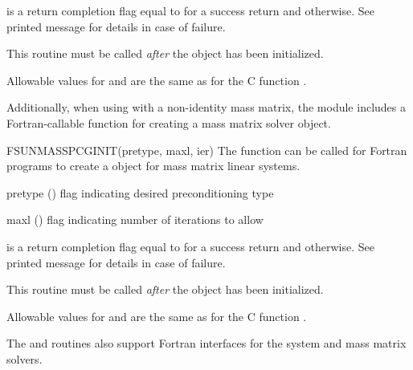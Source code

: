 {
   is a return completion flag equal to  for a success
  return and  otherwise. See printed message for details in case
  of failure.
}
{
  This routine must be called \emph{after} the {\nvector} object has
  been initialized.

  Allowable values for  and  are the same as for
  the C function .
}
Additionally, when using
{\arkode} with a non-identity mass matrix, the {\sunlinsolpcg} module
includes a Fortran-callable function for creating a
 mass matrix solver object.

{
  FSUNMASSPCGINIT(pretype, maxl, ier)
}
{
  The function  can be called for Fortran programs
  to create a {\sunlinsolpcg} object for mass matrix linear systems.
}
{
  \begin{args}[pretype]
  \item[pretype] ()
    flag indicating desired preconditioning type
  \item[maxl] ()
    flag indicating number of iterations to allow
  \end{args}
}
{
   is a  return completion flag equal to  for a success
  return and  otherwise. See printed message for details in case
  of failure.
}
{
  This routine must be called \emph{after} the {\nvector} object has
  been initialized.

  Allowable values for  and  are the same as for
  the C function .
}
The  and 
routines also support Fortran interfaces for the system and mass
matrix solvers.

